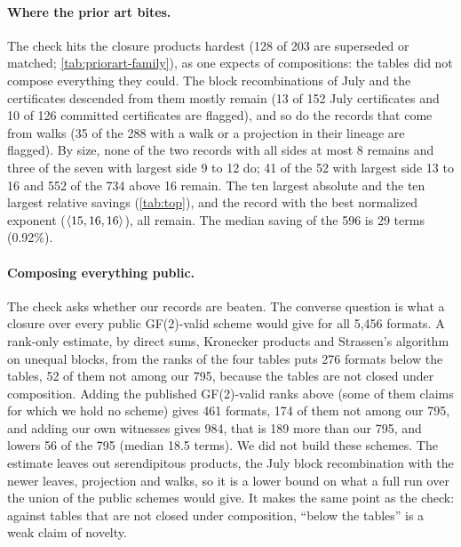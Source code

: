 \paragraph{Where the prior art bites.}
The check hits the closure products hardest (128 of 203 are superseded or matched; \cref{tab:priorart-family}), as one expects of compositions: the tables did not compose everything they could. The block recombinations of July and the certificates descended from them mostly remain (13 of 152 July certificates and 10 of 126 committed certificates are flagged), and so do the records that come from walks (35 of the 288 with a walk or a projection in their lineage are flagged).
By size, none of the two records with all sides at most 8 remains and three of the seven with largest side 9 to 12 do; 41 of the 52 with largest side 13 to 16 and 552 of the 734 above 16 remain.
The ten largest absolute and the ten largest relative savings (\cref{tab:top}), and the record with the best normalized exponent ($\langle 15,16,16\rangle$), all remain. The median saving of the 596 is 29 terms (0.92\%).

\paragraph{Composing everything public.}
The check asks whether our records are beaten. The converse question is what a closure over every public GF(2)-valid scheme would give for all 5{,}456 formats. A rank-only estimate, by direct sums, Kronecker products and Strassen's algorithm on unequal blocks, from the ranks of the four tables puts 276 formats below the tables, 52 of them not among our 795, because the tables are not closed under composition. Adding the published GF(2)-valid ranks above (some of them claims for which we hold no scheme) gives 461 formats, 174 of them not among our 795, and adding our own witnesses gives 984, that is 189 more than our 795, and lowers 56 of the 795 (median 18.5 terms).
We did not build these schemes. The estimate leaves out serendipitous products, the July block recombination with the newer leaves, projection and walks, so it is a lower bound on what a full run over the union of the public schemes would give. It makes the same point as the check: against tables that are not closed under composition, ``below the tables'' is a weak claim of novelty.

